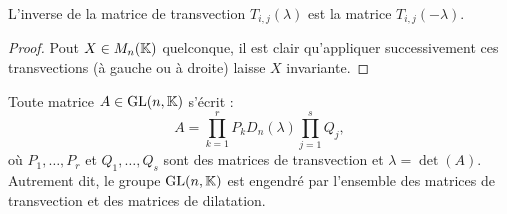 \begin{lem}
\label{lem:2}
L'inverse de la matrice de transvection $T_{i,j}(\lambda)$ est la matrice $T_{i,j}(-\lambda)$.
\end{lem}

\begin{proof}
Pout $X \in M_{n}(\mathbb{K})$ quelconque, il est clair qu'appliquer successivement ces transvections (à gauche ou à droite) laisse $X$ invariante.
\end{proof}

\begin{thm}
Toute matrice $A \in \text{GL}(n,\mathbb{K})$ s'écrit :
\[ A = \prod_{k=1}^r P_k D_n(\lambda) \prod_{j=1}^s Q_j, \]
où $P_1, \dots, P_r$ et $Q_1, \dots, Q_s$ sont des matrices de transvection et $\lambda = \det(A)$. 
Autrement dit, le groupe $\text{GL}(n,\mathbb{K})$ est engendré par l'ensemble des matrices de transvection et des matrices de dilatation.
\end{thm}

